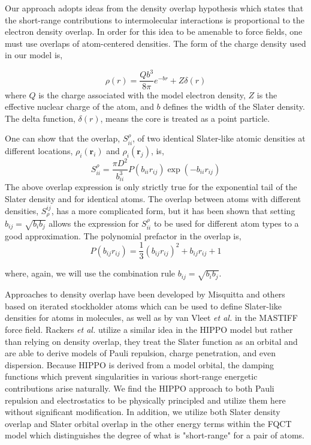 \documentclass[journal=jctcce,manuscript=article]{achemso}
\begin{document}
Our approach adopts ideas from the density overlap hypothesis\cite{kim1981dependence,wheatley1990overlap,gavezzotti2002calculation,van2016beyond,van2018new}
which states that the short-range contributions to intermolecular interactions is proportional to the electron density overlap. In order for this idea to be amenable to force fields, one must use overlaps of atom-centered
densities. The form of the charge density used in our model is,

\begin{equation}
  \rho(r)=\frac{Qb^3}{8\pi}e^{-br}+Z\delta(r)
  \label{eq:slater}
\end{equation}
\noindent
where $Q$ is the charge associated with the model electron density, $Z$ is the effective nuclear charge of the atom, and $b$ defines the width of the Slater density. The delta function, $\delta(r)$, means the core is treated as a point particle. 

One can show that the overlap, $S_{ii}^\rho$, of two identical Slater-like atomic densities at different locations, $\rho_i(\bm{r}_i)$ and $\rho_i(\bm{r}_j)$, is,
\begin{equation}
  S_{ii}^\rho=\frac{\pi D^2}{b_{ii}^3}P(b_{ii}r_{ij})\exp(-b_{ii}r_{ij})
\end{equation}
The above overlap expression is only strictly true for the exponential tail of the Slater density and for identical atoms. The overlap between atoms with different densities, $S^{ij}_\rho$, has a more complicated form, but it has been shown that setting $b_{ij}=\sqrt{b_ib_j}$ allows the expression
for $S_{ii}^\rho$ to be used for different atom types to a good
approximation\cite{van2016beyond}. The polynomial prefactor in the overlap is,
\begin{equation}
  P(b_{ij}r_{ij})=\frac13(b_{ij}r_{ij})^2 + b_{ij}r_{ij}+1
\end{equation}

where, again, we will use the combination rule $b_{ij}=\sqrt{b_ib_j}$. 

Approaches to density overlap have been developed by Misquitta and others\cite{misquitta2014distributed,misquitta2018isa} based on iterated stockholder atoms which can be used to define Slater-like densities for atoms in molecules, as well as by van Vleet \textit{et al.} in the MASTIFF force field.\cite{van2016beyond,van2018new} Rackers \textit{et al.} utilize a similar idea in the HIPPO model\cite{rackers2021polarizable}
but rather than relying on density overlap, they treat the Slater function as an orbital and are able to derive models of Pauli repulsion, charge penetration, and even dispersion. Because HIPPO is derived from a model orbital, the damping functions which prevent singularities in various short-range energetic contributions arise naturally. We find the HIPPO approach to both Pauli repulsion and electrostatics to be physically principled and utilize them here without significant modification. In addition, we utilize both Slater density overlap and Slater orbital overlap in the other energy terms within the FQCT model which distinguishes the degree of what is "short-range" for a pair of atoms. 
\end{document}
